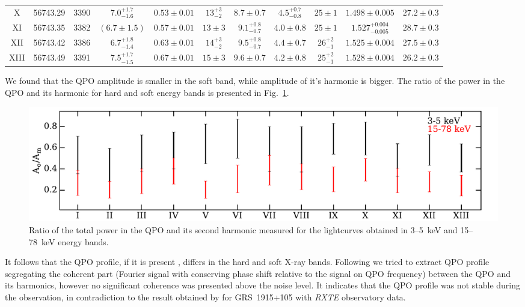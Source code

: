 \documentclass[a4paper,fleqn,usenatbib]{mnras}
\begin{document}
\begin{table}
\begin{tabular}{|c|c|c|c|c|c|c|c|c|c|c|}
X & 56743.29 & 3390 & $7.0_{-1.6}^{+1.7}$ & $0.53\pm0.01$ & $13_{-2}^{+3}$ & $8.7\pm0.7$ & $4.5_{-0.8}^{+0.7}$ & $25\pm1$ & $1.498\pm0.005$ & $27.2\pm0.3$ \\
XI & 56743.35 & 3382 & $(6.7\pm1.5)$ & $0.57\pm0.01$ & $13\pm3$ & $9.1_{-0.7}^{+0.8}$ & $4.0\pm0.8$ & $25\pm1$ & $1.527_{-0.005}^{+0.004}$ & $28.7\pm0.3$ \\
XII & 56743.42 & 3386 & $6.7_{-1.4}^{+1.8}$ & $0.63\pm0.01$ & $14_{-2}^{+3}$ & $9.5_{-0.7}^{+0.8}$ & $4.4\pm0.7$ & $26_{-1}^{+2}$ & $1.525\pm0.004$ & $27.5\pm0.3$ \\
XIII & 56743.49 & 3391 & $7.5_{-1.5}^{+1.7}$ & $0.67\pm0.01$ & $15\pm3$ & $9.6\pm0.7$ & $4.2\pm0.8$ & $25_{-1}^{+2}$ & $1.528\pm0.004$ & $26.2\pm0.3$ \\
\hline
\end{tabular}
\end{table}


We found that the QPO amplitude is smaller in the soft band, while amplitude of it's harmonic is bigger.
The ratio of the power in the QPO and its harmonic for hard and soft energy bands is presented in Fig.~\ref{fig:qpo_ratio}.
\begin{figure}
\includegraphics[width=\columnwidth]{QPO_and_harmonic_ratio_ylabel.pdf}
        \caption{Ratio of the total power in the QPO and its second harmonic measured for the lightcurves obtained in 3--5~keV and 15--78~keV energy bands.}
        \label{fig:qpo_ratio}
\end{figure}
It follows that the QPO profile, if it is present \citep[see, e.g.][]{2015MNRAS.446.3516I}, differs in the hard and soft X-ray bands.
Following \citep{2015MNRAS.446.3516I} we tried to extract QPO profile segregating the coherent part (Fourier signal with conserving phase shift relative to the signal on QPO frequency) between the QPO and its harmonics, however no significant coherence was presented above the noise level.
It indicates that the QPO profile was not stable during the observation, in contradiction to the result obtained by \citet{2015MNRAS.446.3516I} for GRS~1915+105 with {\it RXTE} observatory data.
\end{document}
